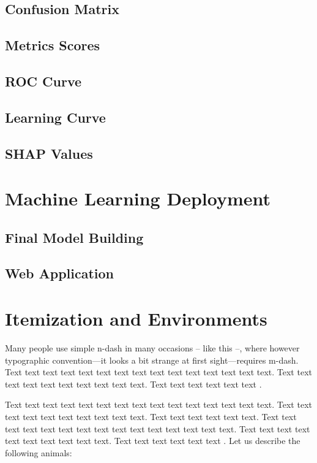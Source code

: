 \subsection{Confusion Matrix}
\subsection{Metrics Scores}
\subsection{ROC Curve}
\subsection{Learning Curve}
\subsection{SHAP Values}
\section{Machine Learning Deployment}
\subsection{Final Model Building}
\subsection{Web Application}

\section{Itemization and Environments}

Many people use simple n-dash in many occasions -- like this --, where however typographic convention---it looks a bit strange at first sight---requires m-dash. Text text text text text text text text text text text text text text text. Text text text text text text text text text text. Text text text text text text \citet{Haufler2006}. 

Text text text text text text text text text text text text text text text. Text text text text text text text text text text. Text text text text text text. Text text text text text text text text text text text text text text text. Text text text text text text text text text text. Text text text text text text \citet{Wells2001}. Let us describe the following animals:

